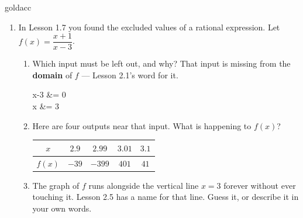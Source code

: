 \documentclass[10pt]{article}
\begin{document}
\vspace{0.10in}

\boxguard[24]
\begin{scenariobox}{goldacc}
\small
\begin{enumerate}[leftmargin=1.6em, itemsep=6pt, topsep=2pt, start=9]

\item In Lesson 1.7 you found the excluded values of a rational expression. Let
$f(x)=\dfrac{x+1}{x-3}$.
\begin{enumerate}[label=(\alph*), leftmargin=1.6em, itemsep=5pt, topsep=4pt]
  \item Which input must be left out, and why? That input is missing from the
        \textbf{domain} of $f$ --- Lesson 2.1's word for it.
\begin{work}
  x-3 &= 0 \\
    x &= 3
\end{work}

  \item Here are four outputs near that input. What is happening to $f(x)$?
        \smallskip

        \renewcommand{\arraystretch}{1.25}
        \begin{tabular}{@{}|c|c|c|c|c|@{}}
        \hline
        $x$ & $2.9$ & $2.99$ & $3.01$ & $3.1$ \\ \hline
        $f(x)$ & $-39$ & $-399$ & $401$ & $41$ \\ \hline
        \end{tabular}
        \smallskip


  \item The graph of $f$ runs alongside the vertical line $x=3$ forever without ever touching it.
        Lesson 2.5 has a name for that line. Guess it, or describe it in your own words.

\end{enumerate}

\end{enumerate}
\end{scenariobox}

\vspace{0.10in}
\end{document}
